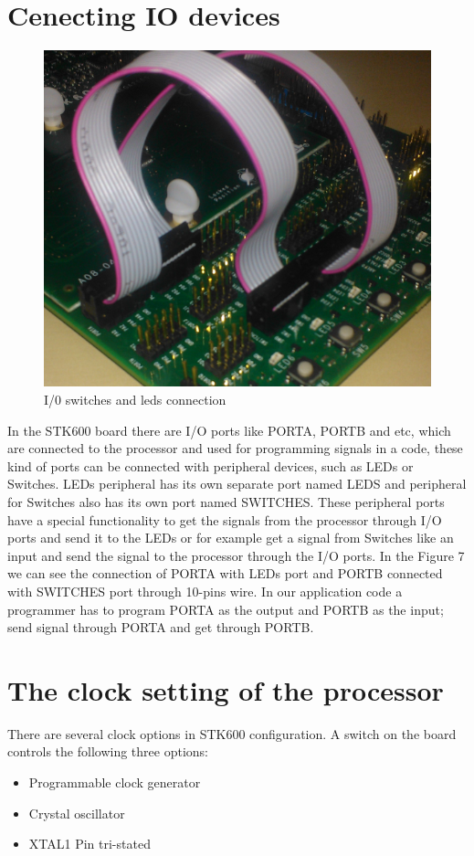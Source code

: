 \documentclass[english]{article}
\begin{document}
\section{Cenecting IO devices}
 \begin{figure}[H]
\centerline{\includegraphics[scale=0.8]{MicroLab2/image009}}
\caption{I/0 switches and leds connection}
\end{figure}
In the STK600 board there are I/O ports like PORTA, PORTB and etc, which are connected to the processor and used for programming signals in a code, these kind of ports can be connected with peripheral devices, such as LEDs or Switches. LEDs peripheral has its own separate port named LEDS and peripheral for Switches also has its own port named SWITCHES. These peripheral ports have a special functionality to get the signals from the processor through I/O ports and send it to the LEDs or for example get a signal from Switches like an input and send the signal to the processor through the I/O ports. In the Figure 7 we can see the connection of PORTA with LEDs port and PORTB connected with SWITCHES port through 10-pins wire. In our application code a programmer has to program PORTA as the output and PORTB as the input; send signal through PORTA and get through PORTB.  
\section{The clock setting of the processor}
There are several clock options in STK600 configuration. A switch on the board controls the following three options:
\begin{itemize}
\item Programmable clock generator
\item Crystal oscillator
\item XTAL1 Pin tri-stated
\end{itemize}
\end{document}
